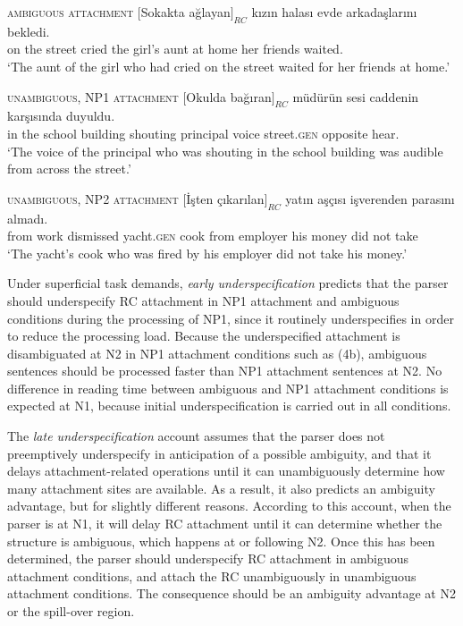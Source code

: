 \documentclass[english, doc]{apa7}\usepackage[]{graphicx}\usepackage[]{color}
\begin{document}
\begin{exe}
\ex \label{StimExp1}
\begin{xlist} 

\item{}\textsc{ambiguous attachment}{} 
\gll $[$Sokakta ağlayan$]_{RC}$ kızın halası evde arkadaşlarını bekledi. \\
    {on the street} {cried} {the girl's} aunt {at home} {her friends} waited. \\
    `The aunt of the girl who had cried on the street waited for her friends at home.'
          
\item{}\textsc{unambiguous, NP1 attachment}{} 
  \gll $[$Okulda bağıran$]_{RC}$    müdürün   sesi   caddenin            karşısında duyuldu. \\
      {in the school building} {shouting} principal voice  street.\textsc{gen} opposite   hear. \\
`The voice of the principal who was shouting in the school building was audible from across the street.'

\item{}\textsc{unambiguous, NP2 attachment}{} 
 \gll $[$İşten çıkarılan$]_{RC}$  yatın              aşçısı  işverenden      parasını    almadı. \\
{from work} {dismissed} yacht.\textsc{gen} cook    {from employer} {his money} {did not take}    \\
`The yacht's cook who was fired by his employer did not take his money.'

\end{xlist}
\end{exe}

Under superficial task demands, \emph{early underspecification} predicts that the parser should underspecify RC attachment in NP1 attachment and ambiguous conditions during the processing of NP1, since it routinely underspecifies in order to reduce the processing load. Because the underspecified attachment is disambiguated at N2 in NP1 attachment conditions such as (4b), ambiguous sentences should be processed faster than NP1 attachment sentences at N2. No difference in reading time between ambiguous and NP1 attachment conditions is expected at N1, because initial underspecification is carried out in all conditions.

The \emph{late underspecification} account assumes that the parser does not preemptively underspecify in anticipation of a possible ambiguity, and that it delays attachment-related operations until it can unambiguously determine how many attachment sites are available. As a result, it also predicts an ambiguity advantage, but for slightly different reasons. According to this account, when the parser is at N1, it will delay RC attachment until it can determine whether the structure is ambiguous, which happens at or following N2. Once this has been determined, the parser should underspecify RC attachment in ambiguous attachment conditions, and attach the RC unambiguously in unambiguous attachment conditions. The consequence should be an ambiguity advantage at N2 or the spill-over region.
\end{document}
